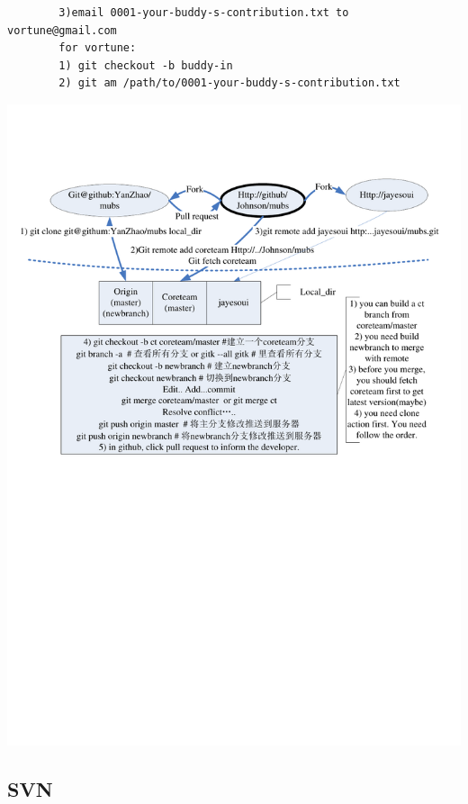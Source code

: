 \documentclass[a4paper,12pt,twoside]{book}
\begin{document}
\begin{CJK*}{UTF8}{song}
\begin{itemize}
\begin{verbatim}
		3)email 0001-your-buddy-s-contribution.txt to vortune@gmail.com
		for vortune:
		1) git checkout -b buddy-in
		2) git am /path/to/0001-your-buddy-s-contribution.txt
		\end{verbatim}
	\end{itemize}

    \includegraphics[scale=0.7]{pics/Visio-git_cooperate}

\subsection{SVN}

\end{CJK*}
\end{document}
